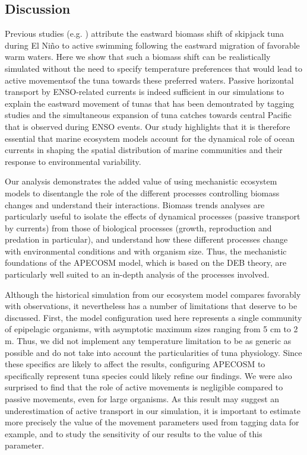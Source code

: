 \subsection{Discussion}

Previous studies (e.g. \citealp{lehodeyNinoSouthernOscillation1997, lehodeyPelagicEcosystemTropical2001}) attribute the eastward biomass shift of skipjack tuna during El Niño to active swimming following the eastward migration of favorable warm waters. Here we show that such a biomass shift can be realistically simulated without the need to specify temperature preferences that would lead to active movementsof the tuna towards these preferred waters. Passive horizontal transport by ENSO-related currents is indeed sufficient in our simulations to explain the eastward movement of tunas that has been demontrated by tagging studies and the simultaneous expansion of tuna catches towards central Pacific that is observed during ENSO events. Our study highlights that it is therefore essential that marine ecosystem models account for the dynamical role of ocean currents in shaping the spatial distribution of marine communities and their response to environmental variability.

Our analysis demonstrates the added value of using mechanistic ecosystem models to disentangle the role of the different processes controlling biomass changes and understand their interactions. Biomass trends analyses are particularly useful to isolate the effects of dynamical processes (passive transport by currents) from those of biological processes (growth, reproduction and predation in particular), and understand how these different processes change with environmental conditions and with  organism size. Thus, the mechanistic foundations of the APECOSM model, which is based on the DEB theory, are particularly well suited to an in-depth analysis of the processes involved.

Although the historical simulation from our ecosystem model compares favorably with observations, it nevertheless has a number of limitations that deserve to be discussed. First, the model configuration used here represents a single community of epipelagic organisms, with asymptotic maximum sizes ranging from 5 cm to 2 m. Thus, we did not implement any temperature limitation to be as generic as possible and do not take into account the particularities of tuna physiology. Since these specifics are likely to affect the results, configuring APECOSM to specifically represent tuna species could likely refine our findings. We were also surprised to find that the role of active movements is negligible compared to passive movements, even for large organisms. As this result may suggest an underestimation of active transport in our simulation, it is important to estimate more precisely the value of the movement parameters used from tagging data for example, and to study the sensitivity of our results to the value of this parameter.

